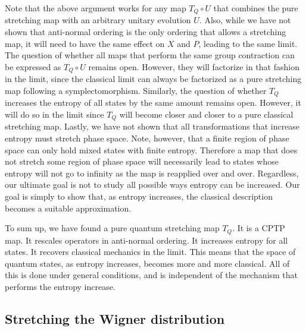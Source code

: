 \documentclass{article}
\begin{document}
Note that the above argument works for any map $T_Q \circ U$ that combines the pure stretching map with an arbitrary unitary evolution $U$. Also, while we have not shown that anti-normal ordering is the only ordering that allows a stretching map, it will need to have the same effect on $X$ and $P$, leading to the same limit. The question of whether all maps that perform the same group contraction can be expressed as $T_Q \circ U$ remains open. However, they will factorize in that fashion in the limit, since the classical limit can always be factorized as a pure stretching map following a symplectomorphism. Similarly, the question of whether $T_Q$ increases the entropy of all states by the same amount remains open. However, it will do so in the limit since $T_Q$ will become closer and closer to a pure classical stretching map. Lastly, we have not shown that all transformations that increase entropy must stretch phase space. Note, however, that a finite region of phase space can only hold mixed states with finite entropy. Therefore a map that does not stretch some region of phase space will necessarily lead to states whose entropy will not go to infinity as the map is reapplied over and over. Regardless, our ultimate goal is not to study all possible ways entropy can be increased. Our goal is simply to show that, as entropy increases, the classical description becomes a suitable approximation.

To sum up, we have found a pure quantum stretching map $T_Q$. It is a CPTP map. It rescales operators in anti-normal ordering. It increases entropy for all states. It recovers classical mechanics in the limit. This means that the space of quantum states, as entropy increases, becomes more and more classical. All of this is done under general conditions, and is independent of the mechanism that performs the entropy increase.

\subsection{Stretching the Wigner distribution}
\end{document}
